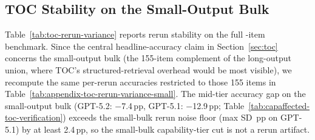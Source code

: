 \documentclass{article}
\begin{document}
\subsection{TOC Stability on the Small-Output Bulk}
\label{sec:appendix-stability-small}

Table~\ref{tab:toc-rerun-variance} reports rerun stability on the full \BenchN-item benchmark. Since the central headline-accuracy claim in Section~\ref{sec:toc} concerns the small-output bulk (the 155-item complement of the long-output union, where TOC's structured-retrieval overhead would be most visible), we recompute the same per-rerun accuracies restricted to those 155 items in Table~\ref{tab:appendix-toc-rerun-variance-small}. The mid-tier accuracy gap on the small-output bulk (GPT-5.2: $-$7.4\,pp, GPT-5.1: $-$12.9\,pp; Table~\ref{tab:capaffected-toc-verification}) exceeds the small-bulk rerun noise floor (max SD \GPTFiveOneTOCSmallRerunSD\,pp on GPT-5.1) by at least 2.4\,pp, so the small-bulk capability-tier cut is not a rerun artifact.
\end{document}
